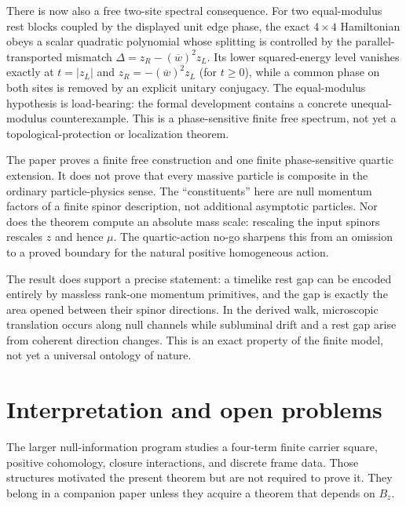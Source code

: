 \documentclass[11pt]{article}
\begin{document}
There is now also a free two-site spectral consequence.  For two equal-modulus
rest blocks coupled by the displayed unit edge phase, the exact $4\times4$
Hamiltonian obeys a scalar quadratic polynomial whose splitting is controlled
by the parallel-transported mismatch
$\Delta=z_R-(\overline w)^2z_L$.  Its lower squared-energy level vanishes
exactly at $t=|z_L|$ and
$z_R=-(\overline w)^2z_L$ (for $t\geq0$), while a common phase on both sites
is removed by an explicit unitary conjugacy.  The equal-modulus hypothesis is
load-bearing: the formal development contains a concrete unequal-modulus
counterexample.  This is a phase-sensitive finite free spectrum, not yet a
topological-protection or localization theorem.

The paper proves a finite free construction and one finite phase-sensitive
quartic extension.  It does not prove that every
massive particle is composite in the ordinary particle-physics sense.  The
``constituents'' here are null momentum factors of a finite spinor description,
not additional asymptotic particles.  Nor does the theorem compute an absolute
mass scale: rescaling the input spinors rescales $z$ and hence $\mu$.  The
quartic-action no-go sharpens this from an omission to a proved boundary for
the natural positive homogeneous action.

The result does support a precise statement: a timelike rest gap can be encoded
entirely by massless rank-one momentum primitives, and the gap is exactly the
area opened between their spinor directions.  In the derived walk, microscopic
translation occurs along null channels while subluminal drift and a rest gap
arise from coherent direction changes.  This is an exact property of the
finite model, not yet a universal ontology of nature.

\section{Interpretation and open problems}

The larger null-information program studies a four-term finite carrier square,
positive cohomology, closure interactions, and discrete frame data.  Those
structures motivated the present theorem but are not required to prove it.
They belong in a companion paper unless they acquire a theorem that depends on
$B_z$.
\end{document}
